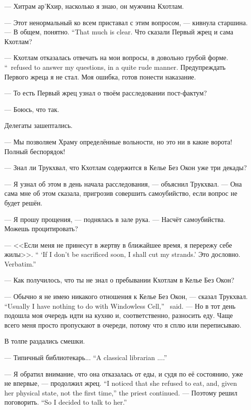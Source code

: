 --- Хитрам ар'Кхир, насколько я знаю, он мужчина Кхотлам.

--- Этот ненормальный ко всем приставал с этим вопросом, --- кивнула старшина.
{--- В общем, понятно.}
{``That much is clear.}
Что сказали Первый жрец и сама Кхотлам?

{--- Кхотлам отказалась отвечать на мои вопросы, в довольно грубой форме.}
{``\Kchotlam\ refused to answer my questions, in a quite rude manner.}
Предупреждать Первого жреца я не стал.
Моя ошибка, готов понести наказание.

--- То есть Первый жрец узнал о твоём расследовании пост-фактум?

--- Боюсь, что так.

Делегаты зашептались.

--- Мы позволяем Храму определённые вольности, но это ни в какие ворота!
Полный беспорядок!

--- Знал ли Трукхвал, что Кхотлам содержится в Келье Без Окон уже три декады?

--- Я узнал об этом в день начала расследования, --- объяснил Трукхвал.
--- Она сама мне об этом сказала, пригрозив совершить самоубийство, если вопрос не будет решён.

--- Я прошу прощения, --- поднялась в зале рука.
--- Насчёт самоубийства.
Можешь процитировать?

{--- <<Если меня не принесут в жертву в ближайшее время, я перережу себе жилы>>.}
{`` `If I don't be sacrificed soon, I shall cut my strands.'}
{Это дословно.}
{Verbatim.''}

--- Как получилось, что ты не знал о пребывании Кхотлам в Келье Без Окон?

{--- Обычно я не имею никакого отношения к Келье Без Окон, --- сказал Трукхвал.}
{``Usually I have nothing to do with Windowless Cell,'' \Trukchual\ said.}
--- Но в тот день подошла моя очередь идти на кухню и, соответственно, разносить еду.
Чаще всего меня просто пропускают в очереди, потому что я сплю или переписываю.

В толпе раздались смешки.

{--- Типичный библиотекарь...}
{``A classical librarian ....''}

{--- Я обратил внимание, что она отказалась от еды, и судя по её состоянию, уже не впервые, --- продолжил жрец.}
{``I noticed that she refused to eat, and, given her physical state, not the first time,'' the priest continued.}
{--- Поэтому решил поговорить.}
{``So I decided to talk to her.''}

